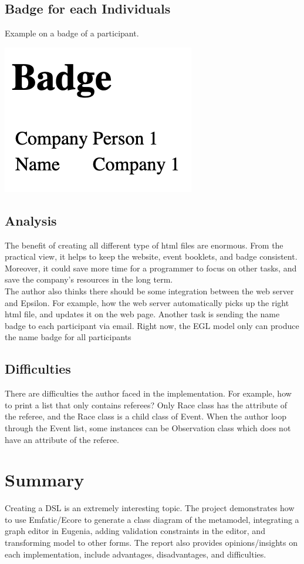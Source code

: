 \documentclass[12pt]{article}
\begin{document}
\subsection{Badge for each Individuals}
Example on a badge of a participant.

\includegraphics[scale = 0.6]{img/badge}

\subsection{Analysis}
The benefit of creating all different type of html files are enormous. From the practical view, it helps to keep the website, 
event booklets, and badge consistent. Moreover, it could save more time for a programmer to focus on other tasks, and save the 
company's resources in the long term.
\\
The author also thinks there should be some integration between the web server and Epsilon. For example, how the web server 
automatically picks up the right html file, and updates it on the web page. Another task is sending the name badge to each 
participant via email. Right now, the EGL model only can produce the name badge for all participants

\subsection{Difficulties}
There are difficulties the author faced in the implementation. For example, how to print a list that only contains referees? 
Only Race class has the attribute of the referee, and the Race class is a child class of Event. When the author loop through 
the Event list, some instances can be Observation class which does not have an attribute of the referee.

\section{Summary}
Creating a DSL is an extremely interesting topic. The project demonstrates how to use Emfatic/Ecore to generate a class 
diagram of the metamodel, integrating a graph editor in Eugenia, adding validation constraints in the editor, and transforming 
model to other forms. The report also provides opinions/insights on each implementation, include advantages, disadvantages, 
and difficulties.
\end{document}
